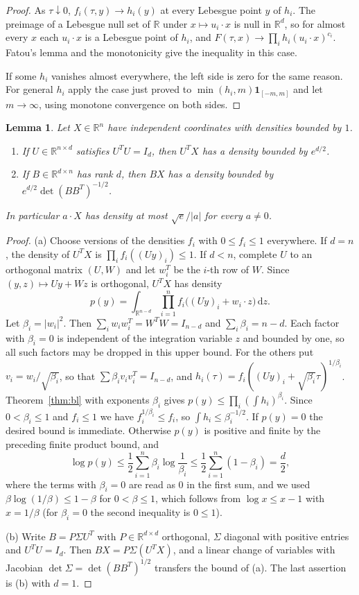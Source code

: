 \documentclass[11pt]{amsart}
\numberwithin{equation}{section}
\newtheorem{lemma}[theorem]{Lemma}
\theoremstyle{definition}
\theoremstyle{remark}
\newcommand{\R}{\mathbb R}
\newcommand{\1}{\mathbf 1}
\newcommand{\dd}{\,\mathrm d}
\newcommand{\abs}[1]{\lvert #1\rvert}
\begin{document}
\begin{proof}
As $\tau\downarrow0$, $f_i(\tau,y)\to h_i(y)$ at every Lebesgue point $y$ of $h_i$. The preimage of a Lebesgue null set of $\R$ under $x\mapsto u_i\cdot x$ is null in $\R^d$, so for almost every $x$ each $u_i\cdot x$ is a Lebesgue point of $h_i$, and $F(\tau,x)\to\prod_ih_i(u_i\cdot x)^{c_i}$. Fatou's lemma and the monotonicity give the inequality in this case.

If some $h_i$ vanishes almost everywhere, the left side is zero for the same reason. For general $h_i$ apply the case just proved to $\min(h_i,m)\1_{[-m,m]}$ and let $m\to\infty$, using monotone convergence on both sides.
\end{proof}

\begin{lemma}\label{lem:projection}
Let $X\in\R^n$ have independent coordinates with densities bounded by $1$.
\begin{enumerate}
\item[(a)] If $U\in\R^{n\times d}$ satisfies $U^TU=I_d$, then $U^TX$ has a density bounded by $e^{d/2}$.
\item[(b)] If $B\in\R^{d\times n}$ has rank $d$, then $BX$ has a density bounded by $e^{d/2}\det(BB^T)^{-1/2}$.
\end{enumerate}
In particular $a\cdot X$ has density at most $\sqrt e/\abs a$ for every $a\ne0$.
\end{lemma}

\begin{proof}
(a) Choose versions of the densities $f_i$ with $0\le f_i\le1$ everywhere. If $d=n$, the density of $U^TX$ is $\prod_if_i((Uy)_i)\le1$. If $d<n$, complete $U$ to an orthogonal matrix $(U,W)$ and let $w_i^T$ be the $i$-th row of $W$. Since $(y,z)\mapsto Uy+Wz$ is orthogonal, $U^TX$ has density
\[
p(y)=\int_{\R^{n-d}}\prod_{i=1}^nf_i\bigl((Uy)_i+w_i\cdot z\bigr)\dd z .
\]
Let $\beta_i=\abs{w_i}^2$. Then $\sum_iw_iw_i^T=W^TW=I_{n-d}$ and $\sum_i\beta_i=n-d$. Each factor with $\beta_i=0$ is independent of the integration variable $z$ and bounded by one, so all such factors may be dropped in this upper bound. For the others put $v_i=w_i/\sqrt{\beta_i}$, so that $\sum\beta_iv_iv_i^T=I_{n-d}$, and $h_i(\tau)=f_i((Uy)_i+\sqrt{\beta_i}\tau)^{1/\beta_i}$. Theorem~\ref{thm:bl} with exponents $\beta_i$ gives $p(y)\le\prod_i(\int h_i)^{\beta_i}$. Since $0<\beta_i\le1$ and $f_i\le1$ we have $f_i^{1/\beta_i}\le f_i$, so $\int h_i\le\beta_i^{-1/2}$. If $p(y)=0$ the desired bound is immediate. Otherwise $p(y)$ is positive and finite by the preceding finite product bound, and
\[
\log p(y)\le\frac12\sum_{i=1}^n\beta_i\log\frac1{\beta_i}\le\frac12\sum_{i=1}^n(1-\beta_i)=\frac d2,
\]
where the terms with $\beta_i=0$ are read as $0$ in the first sum, and we used $\beta\log(1/\beta)\le1-\beta$ for $0<\beta\le1$, which follows from $\log x\le x-1$ with $x=1/\beta$ (for $\beta_i=0$ the second inequality is $0\le1$).

(b) Write $B=P\Sigma U^T$ with $P\in\R^{d\times d}$ orthogonal, $\Sigma$ diagonal with positive entries and $U^TU=I_d$. Then $BX=P\Sigma(U^TX)$, and a linear change of variables with Jacobian $\det\Sigma=\det(BB^T)^{1/2}$ transfers the bound of (a). The last assertion is (b) with $d=1$.
\end{proof}
\end{document}
